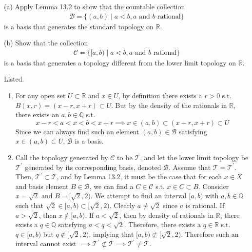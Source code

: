   \begin{exercise}[Munkres 13.8]
    (a) Apply Lemma 13.2 to show that the countable collection
    \begin{align*}
      \mathcal{B} = \{(a, b) \mid a < b, a \text{ and } b \text{ rational}\}
    \end{align*}
    is a basis that generates the standard topology on $\mathbb{R}$.
    
    (b) Show that the collection
    \begin{align*}
      \mathcal{C} = \{[a, b) \mid a < b, a \text{ and } b \text{ rational}\}
    \end{align*}
    is a basis that generates a topology different from the lower limit topology on $\mathbb{R}$.
  \end{exercise}
  \begin{solution}[Munkres 13.8]
    Listed. 
    \begin{enumerate}
      \item For any open set $U \subset \mathbb{R}$ and $x \in U$, by definition there exists a $r > 0$ s.t. $B(x, r) = (x - r, x + r) \subset U$. But by the density of the rationals in $\mathbb{R}$, there exists an $a, b \in \mathbb{Q}$ s.t. 
      \begin{equation}
        x - r < a < x < b < x + r \implies x \in (a, b) \subset (x - r, x + r) \subset U
      \end{equation}
      Since we can always find such an element $(a, b) \in \mathcal{B}$ satisfying $x \in (a, b) \subset U$, $\mathcal{B}$ is a basis.  

    \item Call the topology generated by $\mathscr{C}$ to be $\mathscr{T}$, and let the lower limit topology be $\mathscr{T}^\prime$ generated by its corresponding basis, denoted $\mathscr{B}$. Assume that $\mathscr{T} = \mathscr{T}^\prime$. Then, $\mathscr{T}^\prime \subset \mathscr{T}$, and by Lemma 13.2, it must be the case that for each $x \in X$ and basis element $B \in \mathscr{B}$, we can find a $C \in \mathscr{C}$ s.t. $x \in C \subset B$. Consider $x = \sqrt{2}$ and $B = [\sqrt{2}, 2)$. We attempt to find an interval $[a, b)$ with $a, b \in \mathbb{Q}$ such that $\sqrt{2} \in [a, b)\subset[\sqrt{2}, 2)$. Clearly $a \neq \sqrt{2}$ since $a$ is rational. If $a > \sqrt{2}$, then $x \not\in [a, b)$. If $a < \sqrt{2}$, then by density of rationals in $\mathbb{R}$, there exists a $q \in \mathbb{Q}$ satisfying $a < q < \sqrt{2}$. Therefore, there exists a $q \in \mathbb{R}$ s.t. $q \in [a, b)$ but $q \not\in [\sqrt{2}, 2)$, implying that $[a, b) \not\subset [\sqrt{2}, 2)$. Therefore such an interval cannot exist $\implies \mathscr{T}^\prime \not\subset \mathscr{T} \implies \mathscr{T}^\prime \neq \mathscr{T}$.
    \end{enumerate}
  \end{solution}

